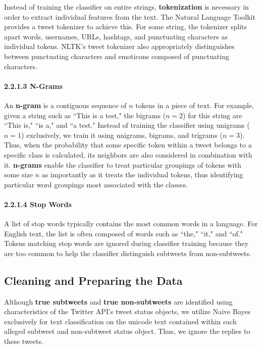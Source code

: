 \documentclass[11pt, twoside, reqno]{book}
\begin{document}
Instead of training the classifier on entire strings, \textbf{tokenization} is necessary in order to extract individual features from the text. The Natural Language Toolkit \cite{nltk} provides a tweet tokenizer to achieve this. For some string, the tokenizer splits apart words, usernames, URLs, hashtags, and punctuating characters as individual tokens. NLTK's tweet tokenizer also appropriately distinguishes between punctuating characters and emoticons composed of punctuating characters.

\paragraph{2.2.1.3  N-Grams}
\label{n_grams}

An \textbf{n-gram} is a contiguous sequence of $n$ tokens in a piece of text. For example, given a string such as ``This is a test," the bigrams ($n=2$) for this string are ``This is," ``is a," and ``a test." Instead of training the classifier using unigrams ($n=1$) exclusively, we train it using unigrams, bigrams, and trigrams ($n=3$). Thus, when the probability that some specific token within a tweet belongs to a specific class is calculated, its neighbors are also considered in combination with it. \textbf{n-grams} enable the classifier to treat particular groupings of tokens with some size $n$ as importantly as it treats the individual tokens, thus identifying particular word groupings most associated with the classes.

\paragraph{2.2.1.4  Stop Words}
\label{stop_words}

A list of stop words typically contains the most common words in a language. For English text, the list is often composed of words such as ``the," ``it," and ``of." Tokens matching stop words are ignored during classifier training because they are too common to help the classifier distinguish subtweets from non-subtweets.

\subsection{Cleaning and Preparing the Data}
\label{cleaning_data}

Although \textbf{true subtweets} and \textbf{true non-subtweets} are identified using characteristics of the Twitter API's tweet status objects, we utilize Naive Bayes exclusively for text classification on the unicode text contained within each alleged subtweet and non-subtweet status object. Thus, we ignore the replies to these tweets.
\end{document}
